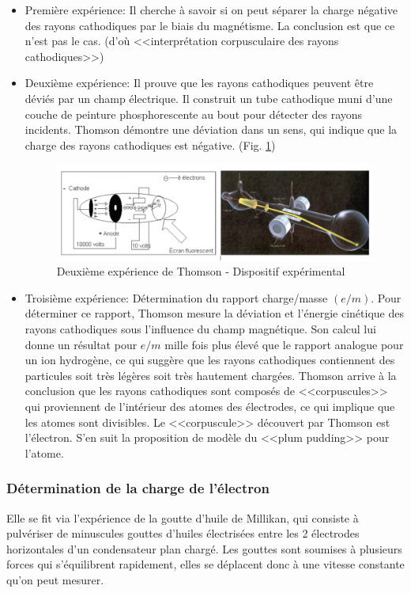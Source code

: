 \begin{itemize}
    \item Première expérience: Il cherche à savoir si on peut séparer la charge négative des rayons cathodiques par le biais du magnétisme. La conclusion est que ce n'est pas le cas. (d'où <<interprétation corpusculaire des rayons cathodiques>>)
    \item Deuxième expérience: Il prouve que les rayons cathodiques peuvent être déviés par un champ électrique. Il construit un tube cathodique muni d'une couche de peinture phosphorescente au bout pour détecter des rayons incidents. Thomson démontre une déviation dans un sens, qui indique que la charge des rayons cathodiques est négative. (Fig. \ref{fig:thompson_exp_2})

    \begin{figure}[ht]
        \centering
        \includegraphics[scale=0.60]{Images1/2eexpthomson.PNG}
        \caption{Deuxième expérience de Thomson - Dispositif expérimental}
        \label{fig:thompson_exp_2}
    \end{figure}

    \item Troisième expérience: Détermination du rapport charge/masse $(e/m)$. Pour déterminer ce rapport, Thomson mesure la déviation et l'énergie cinétique des rayons cathodiques sous l'influence du champ magnétique. Son calcul lui donne un résultat pour $e/m$ mille fois plus élevé que le rapport analogue pour un ion hydrogène, ce qui suggère que les rayons cathodiques contiennent des particules soit très légères soit très hautement chargées. Thomson arrive à la conclusion que les rayons cathodiques sont composés de <<corpuscules>> qui proviennent de l'intérieur des atomes des électrodes, ce qui implique que les atomes sont divisibles. Le <<corpuscule>> découvert par Thomson est l'électron.
    S'en suit la proposition de modèle du <<plum pudding>> pour l'atome.
\end{itemize}

\subsubsection{Détermination de la charge de l'électron}
Elle se fit via l'expérience de la goutte d'huile de Millikan, qui consiste à pulvériser de minuscules gouttes d'huiles électrisées entre les 2 électrodes horizontales d'un condensateur plan chargé. Les gouttes sont soumises à plusieurs forces qui s'équilibrent rapidement, elles se déplacent donc à une vitesse constante qu'on peut mesurer.

